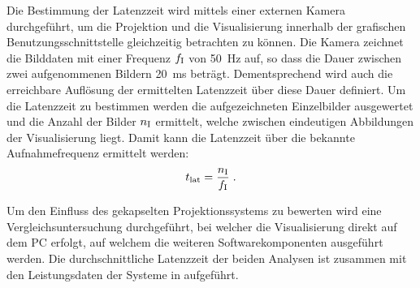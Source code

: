 \prever{
}

Die Bestimmung der Latenzzeit wird mittels einer externen Kamera durchgeführt, um die Projektion und die Visualisierung innerhalb der grafischen Benutzungsschnittstelle gleichzeitig betrachten zu können. Die Kamera zeichnet die Bilddaten mit einer Frequenz $f_{\mathrm{I}}$ von \SI{50}{\Hz} auf, so dass die Dauer zwischen zwei aufgenommenen Bildern \SI{20}{\milli\second} beträgt. Dementsprechend wird auch die erreichbare Auflösung der ermittelten Latenzzeit über diese Dauer definiert. Um die Latenzzeit zu bestimmen werden die aufgezeichneten Einzelbilder ausgewertet und die Anzahl der Bilder $n_{\mathrm{I}}$ ermittelt, welche zwischen eindeutigen Abbildungen der Visualisierung liegt. Damit kann die Latenzzeit über die bekannte Aufnahmefrequenz ermittelt werden:
%
\begin{equation}
t_{\mathrm{lat}} = \frac{n_{\mathrm{I}}}{f_{\mathrm{I}}} \; \text{.}
\end{equation}


Um den Einfluss des gekapselten Projektionssystems zu bewerten wird eine Vergleichsuntersuchung durchgeführt, bei welcher die Visualisierung direkt auf dem PC erfolgt, auf welchem die weiteren Softwarekomponenten ausgeführt werden. Die durchschnittliche Latenzzeit der beiden Analysen ist zusammen mit den Leistungsdaten der Systeme in  aufgeführt.



